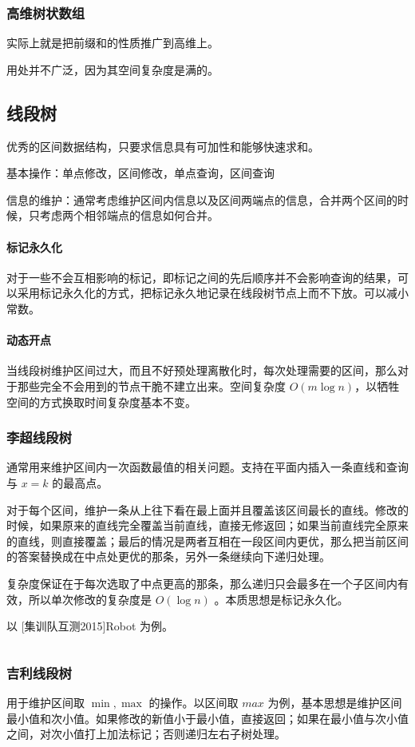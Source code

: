 \documentclass[UTF-8]{ctexart}
\newcommand{\cpp}[1]{\inputminted[bgcolor=bg,breaklines,breakanywhere=true]{c++}{#1}}
\begin{document}
			\subsubsection{高维树状数组}
			实际上就是把前缀和的性质推广到高维上。
	
			用处并不广泛，因为其空间复杂度是满的。
		\subsection{线段树}
		优秀的区间数据结构，只要求信息具有可加性和能够快速求和。
	
		基本操作：单点修改，区间修改，单点查询，区间查询
	
		信息的维护：通常考虑维护区间内信息以及区间两端点的信息，合并两个区间的时候，只考虑两个相邻端点的信息如何合并。
		\paragraph{标记永久化} 对于一些不会互相影响的标记，即标记之间的先后顺序并不会影响查询的结果，可以采用标记永久化的方式，把标记永久地记录在线段树节点上而不下放。可以减小常数。
	
		\paragraph{动态开点} 当线段树维护区间过大，而且不好预处理离散化时，每次处理需要的区间，那么对于那些完全不会用到的节点干脆不建立出来。空间复杂度 $O(m \log n)$，以牺牲空间的方式换取时间复杂度基本不变。
			\subsubsection{李超线段树}
			通常用来维护区间内一次函数最值的相关问题。支持在平面内插入一条直线和查询与 $x=k$ 的最高点。
	
			对于每个区间，维护一条从上往下看在最上面并且覆盖该区间最长的直线。修改的时候，如果原来的直线完全覆盖当前直线，直接无修返回；如果当前直线完全原来的直线，则直接覆盖；最后的情况是两者互相在一段区间内更优，那么把当前区间的答案替换成在中点处更优的那条，另外一条继续向下递归处理。
	
			复杂度保证在于每次选取了中点更高的那条，那么递归只会最多在一个子区间内有效，所以单次修改的复杂度是 $O(\log n)$ 。本质思想是标记永久化。
		
			以 [集训队互测2015]Robot 为例。
			\cpp{code/Example/BZOJ3938.cpp}
			\subsubsection{吉利线段树}
			用于维护区间取 $\min,\max$ 的操作。以区间取 $max$ 为例，基本思想是维护区间最小值和次小值。如果修改的新值小于最小值，直接返回；如果在最小值与次小值之间，对次小值打上加法标记；否则递归左右子树处理。
	
\end{document}
